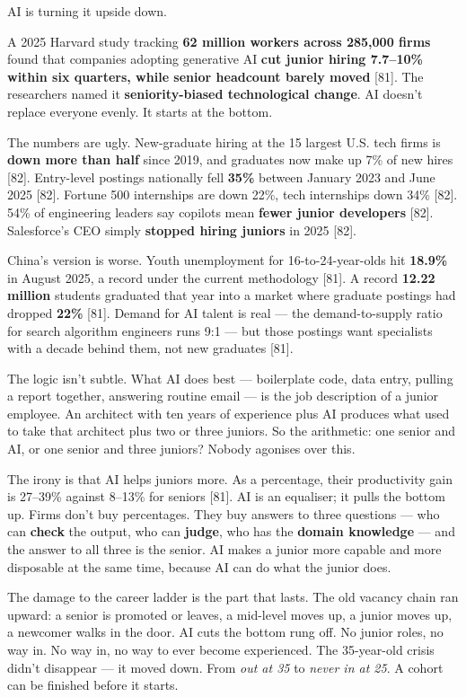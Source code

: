 \documentclass[11pt,a4paper]{article}
\begin{document}
AI is turning it upside down.

A 2025 Harvard study tracking \textbf{62 million workers across 285,000 firms} found that companies adopting generative AI \textbf{cut junior hiring 7.7--10\% within six quarters, while senior headcount barely moved}{} [81]. The researchers named it \textbf{seniority-biased technological change}. AI doesn't replace everyone evenly. It starts at the bottom.

The numbers are ugly. New-graduate hiring at the 15 largest U.S. tech firms is \textbf{down more than half} since 2019, and graduates now make up 7\% of new hires [82]. Entry-level postings nationally fell \textbf{35\%} between January 2023 and June 2025 [82]. Fortune 500 internships are down 22\%, tech internships down 34\% [82]. 54\% of engineering leaders say copilots mean \textbf{fewer junior developers}{} [82]. Salesforce's CEO simply \textbf{stopped hiring juniors} in 2025 [82].

China's version is worse. Youth unemployment for 16-to-24-year-olds hit \textbf{18.9\%} in August 2025, a record under the current methodology [81]. A record \textbf{12.22 million} students graduated that year into a market where graduate postings had dropped \textbf{22\%}{} [81]. Demand for AI talent is real --- the demand-to-supply ratio for search algorithm engineers runs 9:1 --- but those postings want specialists with a decade behind them, not new graduates [81].

The logic isn't subtle. What AI does best --- boilerplate code, data entry, pulling a report together, answering routine email --- is the job description of a junior employee. An architect with ten years of experience plus AI produces what used to take that architect plus two or three juniors. So the arithmetic: one senior and AI, or one senior and three juniors? Nobody agonises over this.

The irony is that AI helps juniors more. As a percentage, their productivity gain is 27--39\% against 8--13\% for seniors [81]. AI is an equaliser; it pulls the bottom up. Firms don't buy percentages. They buy answers to three questions --- who can \textbf{check} the output, who can \textbf{judge}, who has the \textbf{domain knowledge} --- and the answer to all three is the senior. AI makes a junior more capable and more disposable at the same time, because AI can do what the junior does.

The damage to the career ladder is the part that lasts. The old vacancy chain ran upward: a senior is promoted or leaves, a mid-level moves up, a junior moves up, a newcomer walks in the door. AI cuts the bottom rung off. No junior roles, no way in. No way in, no way to ever become experienced. The 35-year-old crisis didn't disappear --- it moved down. From \textit{out at 35} to \textit{never in at 25}. A cohort can be finished before it starts.
\end{document}
